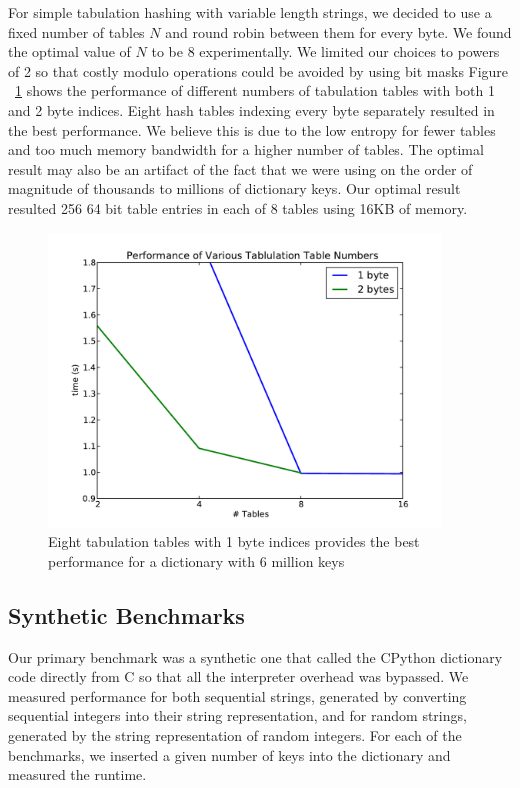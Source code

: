 \documentclass[11pt]{article}
\begin{document}
For simple tabulation hashing with variable length strings, we decided to use a
fixed number of tables $N$ and round robin between them for every byte.  We
found the optimal value of $N$ to be 8 experimentally.  We limited our choices
to powers of 2 so that costly modulo operations could be avoided by using bit
masks Figure ~\ref{fig:tables} shows the performance of different numbers of
tabulation tables with both 1 and 2 byte indices.  Eight hash tables indexing
every byte separately resulted in the best performance.    We believe this is due
to the low entropy for fewer tables and too much memory bandwidth for a higher
number of tables.  The optimal result may also be an artifact of the fact that
we were using on the order of magnitude of thousands to millions of dictionary
keys.  Our optimal result resulted 256 64
bit table entries in each of 8 tables using 16KB of memory.
 \begin{figure}[H]
   \centering
   \includegraphics[width=4.1in]{tables.pdf}
   \caption{Eight tabulation tables with 1 byte indices provides the best performance for a
   dictionary with 6 million keys}
   \label{fig:tables}
 \end{figure}
       

\subsection{Synthetic Benchmarks}

Our primary benchmark was a synthetic one that called the CPython dictionary
code directly from C so that all the interpreter overhead was bypassed.  We
measured performance for both sequential strings, generated by converting
sequential integers into their string representation, and for random strings,
generated by the string representation of random integers.  For each of the
benchmarks, we inserted a given number of keys into the dictionary and measured
the runtime.
\end{document}
